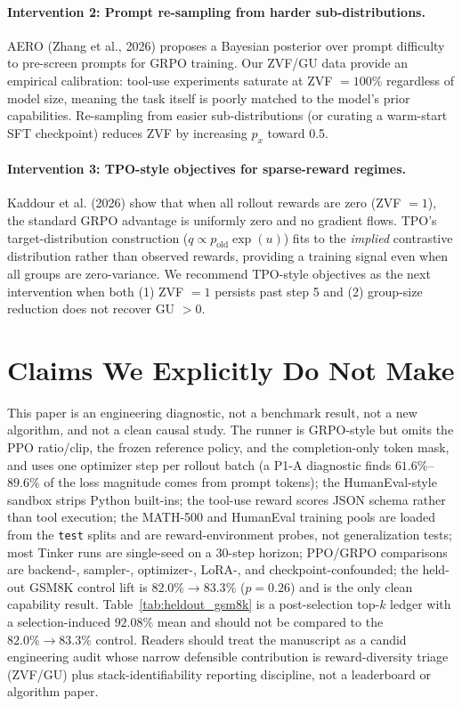 \documentclass{article}
\begin{document}
\paragraph{Intervention 2: Prompt re-sampling from harder sub-distributions.}
AERO (Zhang et al., 2026) proposes a Bayesian posterior over prompt difficulty
to pre-screen prompts for GRPO training.  Our ZVF/GU data provide an empirical
calibration: tool-use experiments saturate at ZVF $= 100\%$ regardless of model
size, meaning the task itself is poorly matched to the model's prior
capabilities.  Re-sampling from easier sub-distributions (or curating a
warm-start SFT checkpoint) reduces ZVF by increasing $p_x$ toward 0.5.

\paragraph{Intervention 3: TPO-style objectives for sparse-reward regimes.}
Kaddour et al. (2026) show that when all rollout rewards are zero (ZVF $= 1$),
the standard GRPO advantage is uniformly zero and no gradient flows.
TPO's target-distribution construction ($q \propto p_{\text{old}} \exp(u)$) fits to
the \emph{implied} contrastive distribution rather than observed rewards,
providing a training signal even when all groups are zero-variance.
We recommend TPO-style objectives as the next intervention when both
(1) ZVF $= 1$ persists past step 5 and (2) group-size reduction does not
recover GU $> 0$.



\section*{Claims We Explicitly Do Not Make}
\label{sec:claims_we_do_not_make}

This paper is an engineering diagnostic, not a benchmark result, not a new algorithm, and not a clean causal study. The runner is GRPO-style but omits the PPO ratio/clip, the frozen reference policy, and the completion-only token mask, and uses one optimizer step per rollout batch (a P1-A diagnostic finds $61.6\%$--$89.6\%$ of the loss magnitude comes from prompt tokens); the HumanEval-style sandbox strips Python built-ins; the tool-use reward scores JSON schema rather than tool execution; the MATH-500 and HumanEval training pools are loaded from the \texttt{test} splits and are reward-environment probes, not generalization tests; most Tinker runs are single-seed on a 30-step horizon; PPO/GRPO comparisons are backend-, sampler-, optimizer-, LoRA-, and checkpoint-confounded; the held-out GSM8K control lift is $82.0\%\!\to\!83.3\%$ ($p=0.26$) and is the only clean capability result. Table~\ref{tab:heldout_gsm8k} is a post-selection top-$k$ ledger with a selection-induced $92.08\%$ mean and should not be compared to the $82.0\%\!\to\!83.3\%$ control. Readers should treat the manuscript as a candid engineering audit whose narrow defensible contribution is reward-diversity triage (ZVF/GU) plus stack-identifiability reporting discipline, not a leaderboard or algorithm paper.
\end{document}
